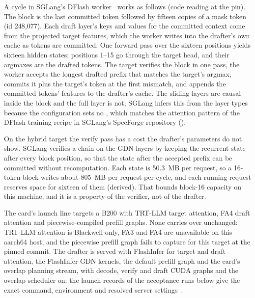A cycle in SGLang's DFlash worker~\cite{sgcode} works as follows (code reading at the pin). The block is the last committed token followed by fifteen copies of a mask token (id 248,077). Each draft layer's keys and values for the committed context come from the projected target features, which the worker writes into the drafter's own cache as tokens are committed. One forward pass over the sixteen positions yields sixteen hidden states; positions 1--15 go through the target head, and their argmaxes are the drafted tokens. The target verifies the block in one pass, the worker accepts the longest drafted prefix that matches the target's argmax, commits it plus the target's token at the first mismatch, and appends the committed tokens' features to the drafter's cache. The sliding layers are causal inside the block and the full layer is not; SGLang infers this from the layer types because the configuration sets no , which matches the attention pattern of the DFlash training recipe in SGLang's SpecForge repository ().

On the hybrid target the verify pass has a cost the drafter's parameters do not show. SGLang verifies a chain on the GDN layers by keeping the recurrent state after every block position, so that the state after the accepted prefix can be committed without recomputation. Each state is 50.3~MB per request, so a 16-token block writes about 805~MB per request per cycle, and each running request reserves space for sixteen of them (derived). That bounds block-16 capacity on this machine, and it is a property of the verifier, not of the drafter.

The card's launch line targets a B200 with TRT-LLM target attention, FA4 draft attention and piecewise-compiled prefill graphs. None carries over unchanged: TRT-LLM attention is Blackwell-only, FA3 and FA4 are unavailable on this aarch64 host, and the piecewise prefill graph fails to capture for this target at the pinned commit. The drafter is served with FlashInfer for target and draft attention, the FlashInfer GDN kernels, the default prefill graph and the card's overlap planning stream, with decode, verify and draft CUDA graphs and the overlap scheduler on; the launch records of the acceptance runs below give the exact command, environment and resolved server settings~.

